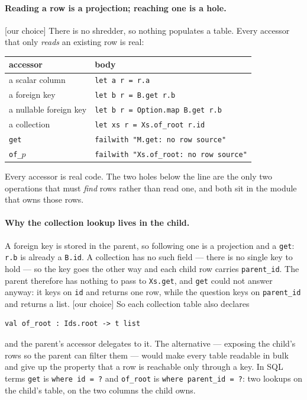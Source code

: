 \documentclass[11pt,a4paper]{article}
\newcommand{\ourcall}{\textcolor{ours}{\textsf{[our choice]}}}
\begin{document}
\paragraph{Reading a row is a projection; reaching one is a hole.}
\ourcall{} There is no shredder, so nothing populates a table. Every accessor
that only \emph{reads} an existing row is real:

\begin{center}
\begin{tabular}{ll}
\hline
\textbf{accessor} & \textbf{body} \\
\hline
a scalar column & \texttt{let a r = r.a} \\
a foreign key & \texttt{let b r = B.get r.b} \\
a nullable foreign key & \texttt{let b r = Option.map B.get r.b} \\
a collection & \texttt{let xs r = Xs.of\_root r.id} \\
\hline
\texttt{get} & \texttt{failwith "M.get: no row source"} \\
\texttt{of\_}$p$ & \texttt{failwith "Xs.of\_root: no row source"} \\
\hline
\end{tabular}
\end{center}

\noindent
Every accessor is real code. The two holes below the line are the only two
operations that must \emph{find} rows rather than read one, and both sit in
the module that owns those rows.

\paragraph{Why the collection lookup lives in the child.} A foreign key is
stored in the parent, so following one is a projection and a \texttt{get}:
\texttt{r.b} is already a \texttt{B.id}. A collection has no such field ---
there is no single key to hold --- so the key goes the other way and each
child row carries \texttt{parent\_id}. The parent therefore has nothing to
pass to \texttt{Xs.get}, and \texttt{get} could not answer anyway: it keys on
\texttt{id} and returns one row, while the question keys on
\texttt{parent\_id} and returns a list. \ourcall{} So each collection table
also declares

\begin{lstlisting}[style=ml]
val of_root : Ids.root -> t list
\end{lstlisting}

\noindent
and the parent's accessor delegates to it. The alternative --- exposing the
child's rows so the parent can filter them --- would make every table
readable in bulk and give up the property that a row is reachable only
through a key. In SQL terms \texttt{get} is
\texttt{where id = ?} and \texttt{of\_root} is \texttt{where parent\_id = ?}:
two lookups on the child's table, on the two columns the child owns.
\end{document}
